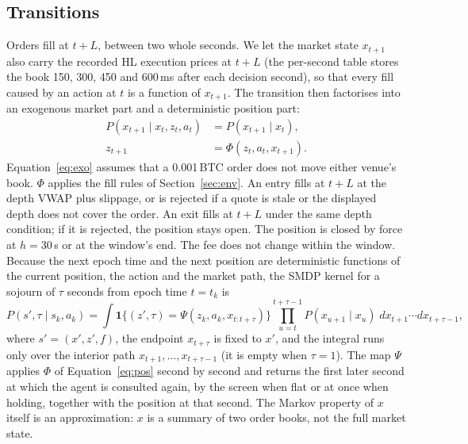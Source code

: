 \documentclass[12pt,a4paper]{article}
\begin{document}
\subsection{Transitions}
Orders fill at $t+L$, between two whole seconds. We let the market state $x_{t+1}$ also carry
the recorded HL execution prices at $t+L$ (the per-second table stores the book 150, 300, 450
and 600\,ms after each decision second), so that every fill caused by an action at $t$ is a
function of $x_{t+1}$. The transition then factorises into an exogenous market part and a
deterministic position part:
\begin{align}
P(x_{t+1}\mid x_t,z_t,a_t)&=P(x_{t+1}\mid x_t), \label{eq:exo}\\
z_{t+1}&=\Phi(z_t,a_t,x_{t+1}). \label{eq:pos}
\end{align}
Equation~\eqref{eq:exo} assumes that a 0.001\,BTC order does not move either venue's book.
$\Phi$ applies the fill rules of Section~\ref{sec:env}. An entry fills at $t+L$ at the depth
VWAP plus slippage, or is rejected if a quote is stale or the displayed depth does not cover
the order. An exit fills at $t+L$ under the same depth condition; if it is rejected, the
position stays open. The position is closed by force at $h=30$\,s or at the window's end. The fee does not change
within the window. Because the next epoch time and the next position are deterministic
functions of the current position, the action and the market path, the SMDP kernel for a
sojourn of $\tau$ seconds from epoch time $t=t_k$ is
\begin{equation}
P(s',\tau\mid s_k,a_k)=\int \mathbf{1}\bigl\{(z',\tau)=
\Psi(z_k,a_k,x_{t:t+\tau})\bigr\}\prod_{u=t}^{t+\tau-1}P(x_{u+1}\mid x_u)\;
dx_{t+1}\cdots dx_{t+\tau-1},
\label{eq:kernel}
\end{equation}
where $s'=(x',z',f)$, the endpoint $x_{t+\tau}$ is fixed to $x'$, and the integral runs
only over the interior path $x_{t+1},\ldots,x_{t+\tau-1}$ (it is empty when $\tau=1$). The
map $\Psi$ applies $\Phi$ of Equation~\eqref{eq:pos} second by second and returns the first
later second at which the agent is consulted again, by the screen when flat or at once when
holding, together with the position at that second. The Markov property of $x$ itself is an
approximation: $x$ is a summary of two order books, not the full market state.
\end{document}
